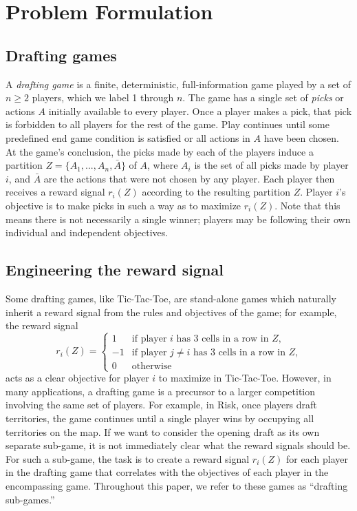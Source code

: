 \documentclass[letterpaper]{article}
\numberwithin{equation}{section}
\numberwithin{theorem}{section}
\numberwithin{lemma}{section}
\numberwithin{df}{section}
\begin{document}
\section{Problem Formulation}
\label{sec:Prob}

\subsection{Drafting games}
\label{subsec:DraftingGames}

A \emph{drafting game} is a finite, deterministic, full-information game played by a set of $n \geq 2$ players, which we label 1 through $n$.  The game has a single set of \emph{picks} or actions $A$ initially available to every player.  Once a player makes a pick, that pick is forbidden to all players for the rest of the game.  Play continues until some predefined end game condition is satisfied or all actions in $A$ have been chosen.  At the game's conclusion, the picks made by each of the players induce a partition $Z = \{A_1, ..., A_{n}, \bar{A}\}$ of $A$, where $A_i$ is the set of all picks made by player $i$, and $\bar{A}$ are the actions that were not chosen by any player.  Each player then receives a reward signal $r_i(Z)$ according to the resulting partition $Z$.  Player $i$'s objective is to make picks in such a way as to maximize $r_i(Z)$.  Note that this means there is not necessarily a single winner; players may be following their own individual and independent objectives.

\subsection{Engineering the reward signal}

Some drafting games, like Tic-Tac-Toe, are stand-alone games which naturally inherit a reward signal from the rules and objectives of the game; for example, the reward signal
\[ r_i(Z) = \left\{ \begin{array}{cl} 1 & \text{if player $i$ has 3 cells in a row in $Z$,} \\ -1 & \text{if player $j \neq i$ has 3 cells in a row in $Z$,} \\ 0 & \text{otherwise} \end{array} \right. \]
acts as a clear objective for player $i$ to maximize in Tic-Tac-Toe.  However, in many applications, a drafting game is a precursor to a larger competition involving the same set of players.  For example, in Risk, once players draft territories, the game continues until a single player wins by occupying all territories on the map.  If we want to consider the opening draft as its own separate sub-game, it is not immediately clear what the reward signals should be.  For such a sub-game, the task is to create a reward signal $r_i(Z)$ for each player in the drafting game that correlates with the objectives of each player in the encompassing game.  Throughout this paper, we refer to these %
games as ``drafting sub-games.''
\end{document}
